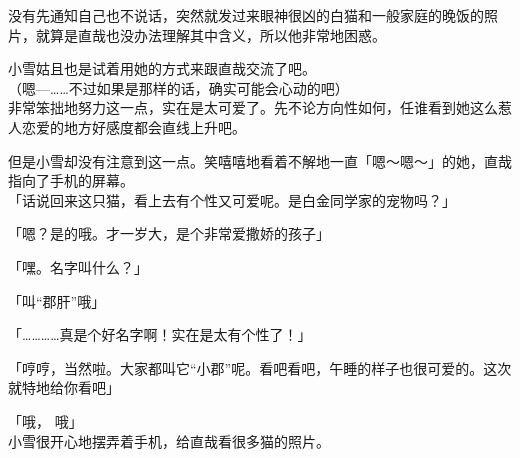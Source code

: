 没有先通知自己也不说话，突然就发过来眼神很凶的白猫和一般家庭的晚饭的照片，就算是直哉也没办法理解其中含义，所以他非常地困惑。

小雪姑且也是试着用她的方式来跟直哉交流了吧。\\

（嗯—……不过如果是那样的话，确实可能会心动的吧）\\

非常笨拙地努力这一点，实在是太可爱了。先不论方向性如何，任谁看到她这么惹人恋爱的地方好感度都会直线上升吧。

但是小雪却没有注意到这一点。笑嘻嘻地看着不解地一直「嗯～嗯～」的她，直哉指向了手机的屏幕。\\%

「话说回来这只猫，看上去有个性又可爱呢。是白金同学家的宠物吗？」

「嗯？是的哦。才一岁大，是个非常爱撒娇的孩子」

「嘿。名字叫什么？」

「叫“郡肝”哦」

「…………真是个好名字啊！实在是太有个性了！」

「哼哼，当然啦。大家都叫它“小郡”呢。看吧看吧，午睡的样子也很可爱的。这次就特地给你看吧」

「哦， 哦」\\

小雪很开心地摆弄着手机，给直哉看很多猫的照片。

